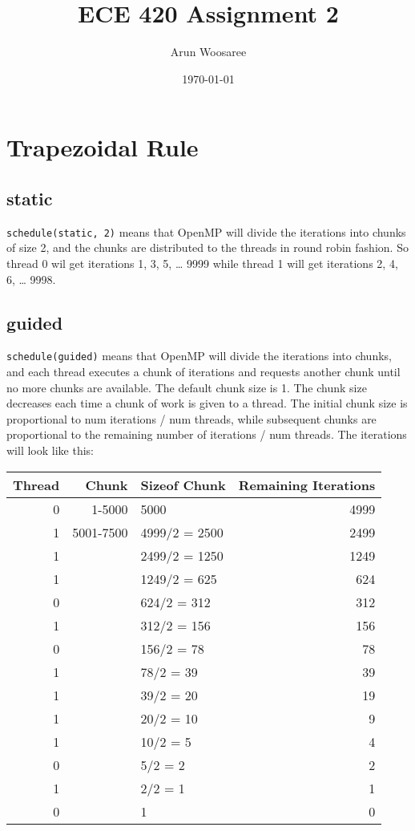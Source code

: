 \documentclass[11pt]{article}
\author{Arun Woosaree}
\date{\today}
\title{ECE 420 Assignment 2}
\begin{document}
\maketitle
\tableofcontents



\section{Trapezoidal Rule}
\label{sec:org9bf5b6b}

\subsection{static}
\label{sec:org04432e9}
\texttt{schedule(static, 2)} means that OpenMP will divide the iterations into chunks of size 2, and the chunks are distributed to the threads in round robin fashion.
So thread 0 wil get iterations 1, 3, 5, \ldots{} 9999 while thread 1 will get iterations 2, 4, 6, \ldots{} 9998.
\subsection{guided}
\label{sec:orgead9c7e}
\texttt{schedule(guided)} means that OpenMP will divide the iterations into chunks, and each thread executes a chunk of iterations and requests another chunk until no more chunks are available. The default chunk size is 1. The chunk size decreases each time a chunk of work is given to a thread. The initial chunk size is proportional to num iterations / num threads, while subsequent chunks are proportional to the remaining number of iterations / num threads. The iterations will look like this:


\begin{center}
\begin{tabular}{rrlr}
Thread & Chunk & Sizeof Chunk & Remaining Iterations\\
\hline
0 & 1-5000 & 5000 & 4999\\
1 & 5001-7500 & 4999/2 = 2500 & 2499\\
1 &  & 2499/2 = 1250 & 1249\\
1 &  & 1249/2 = 625 & 624\\
0 &  & 624/2 = 312 & 312\\
1 &  & 312/2 = 156 & 156\\
0 &  & 156/2 = 78 & 78\\
1 &  & 78/2 = 39 & 39\\
1 &  & 39/2 = 20 & 19\\
1 &  & 20/2 = 10 & 9\\
1 &  & 10/2 = 5 & 4\\
0 &  & 5/2 = 2 & 2\\
1 &  & 2/2 = 1 & 1\\
0 &  & 1 & 0\\
\end{tabular}
\end{center}
\end{document}
